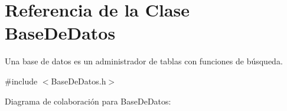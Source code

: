 \hypertarget{classBaseDeDatos}{}\section{Referencia de la Clase Base\+De\+Datos}
\label{classBaseDeDatos}


Una base de datos es un administrador de tablas con funciones de búsqueda.  




{\ttfamily \#include $<$Base\+De\+Datos.\+h$>$}



Diagrama de colaboración para Base\+De\+Datos\+:
